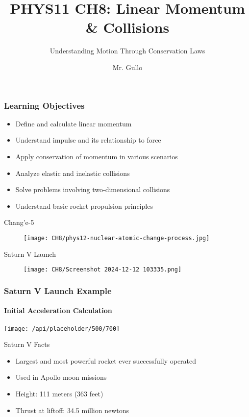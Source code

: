 \documentclass[aspectratio=169]{beamer}
\title[Linear Momentum]{PHYS11 CH8: Linear Momentum \& Collisions}
\subtitle{Understanding Motion Through Conservation Laws}
\author[Mr. Gullo]{Mr. Gullo}
\date[]{}
\begin{document}
\frame{\titlepage}

\begin{frame}
\frametitle{Learning Objectives}
\begin{itemize}
\item Define and calculate linear momentum
\item Understand impulse and its relationship to force
\item Apply conservation of momentum in various scenarios
\item Analyze elastic and inelastic collisions
\item Solve problems involving two-dimensional collisions
\item Understand basic rocket propulsion principles
\end{itemize}
\end{frame}
\begin{frame}{Chang’e-5 }
    \begin{figure}
        \centering
        \texttt{[image: CH8/phys12-nuclear-atomic-change-process.jpg]}
    \end{figure}
\end{frame}

\begin{frame}{Saturn V Launch}
   \begin{figure}
       \centering
       \texttt{[image: CH8/Screenshot 2024-12-12 103335.png]}
   \end{figure}
\end{frame}

\begin{frame}
\frametitle{Saturn V Launch Example}
\framesubtitle{Initial Acceleration Calculation}

\begin{center}
\texttt{[image: /api/placeholder/500/700]}
\end{center}

\begin{block}{Saturn V Facts}
\begin{itemize}
\item Largest and most powerful rocket ever successfully operated
\item Used in Apollo moon missions
\item Height: 111 meters (363 feet)
\item Thrust at liftoff: 34.5 million newtons
\end{itemize}
\end{block}
\end{frame}
\end{document}
